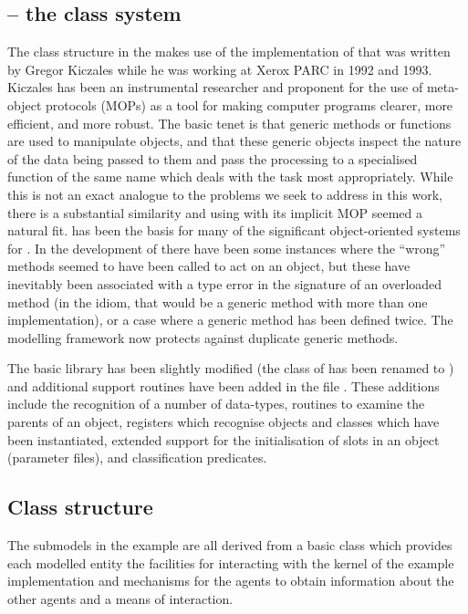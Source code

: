\subsection{\SCLOS -- the class system}

The class structure in the \ReModel makes use of the \Scheme
implementation of \CLOS that was written by Gregor
Kiczales \citep{kiczales1993xerox} while he was working at Xerox PARC
in 1992 and 1993.  Kiczales has been an instrumental researcher and
proponent for the use of meta-object protocols (MOPs) as a tool for
making computer programs clearer, more efficient, and more robust.
The basic tenet is that generic methods or functions are used to
manipulate objects, and that these generic objects inspect the nature
of the data being passed to them and pass the processing to a
specialised function of the same name which deals with the task most
appropriately.  While this is not an exact analogue to the problems we
seek to address in this work, there is a substantial similarity and
using \SCLOS with its implicit MOP seemed a natural fit.  \SCLOS has
been the basis for many of the significant object-oriented systems for
\Scheme.  In the development of \ReModel there have been some
instances where the ``wrong'' methods seemed to have been
called to act on an object, but these have inevitably been associated
with a type error in the signature of an overloaded method (in
the \SCLOS idiom, that would be a generic method with more than one
implementation), or a case where a generic method has been defined
twice. The modelling framework now protects against duplicate generic
methods. 

The basic \SCLOS library has been slightly modified
(the  class of \SCLOS has been renamed
to ) and additional support routines have
been added in the file .  These additions
include the recognition of a number of \Scheme data-types, routines to
examine the parents of an object, registers which recognise objects
and classes which have been instantiated, extended support for the
initialisation of slots in an \SCLOS object (parameter files), and
classification predicates.  

\subsection{Class structure}
The submodels in the example are all derived from a basic
 class which provides each modelled entity the
facilities for interacting with the kernel of the example
implementation and mechanisms for the agents to obtain information
about the other agents and a means of interaction.

